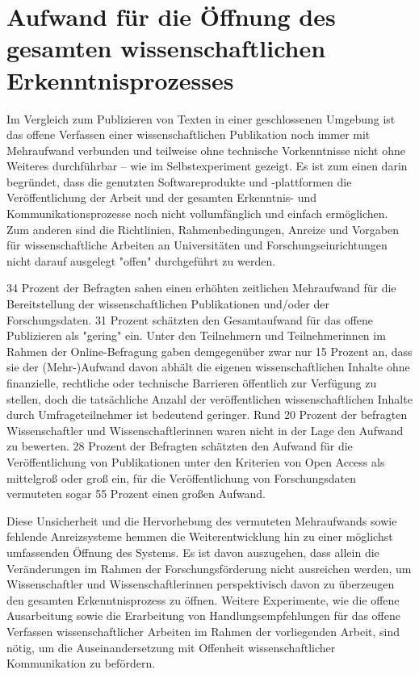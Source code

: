 \section{Aufwand für die Öffnung des gesamten wissenschaftlichen Erkenntnisprozesses}

Im Vergleich zum Publizieren von Texten in einer geschlossenen Umgebung ist das offene Verfassen einer wissenschaftlichen Publikation noch immer mit Mehraufwand verbunden und teilweise ohne technische Vorkenntnisse nicht ohne Weiteres durchführbar – wie im Selbstexperiment gezeigt. Es ist zum einen darin begründet, dass die genutzten Softwareprodukte und -plattformen die Veröffentlichung der Arbeit und der gesamten Erkenntnis- und Kommunikationsprozesse noch nicht vollumfänglich und einfach ermöglichen. Zum anderen sind die Richtlinien, Rahmenbedingungen, Anreize und Vorgaben für wissenschaftliche Arbeiten an Universitäten und Forschungseinrichtungen nicht darauf ausgelegt "offen" durchgeführt zu werden.

34 Prozent der Befragten sahen einen erhöhten zeitlichen Mehraufwand für die Bereitstellung der wissenschaftlichen Publikationen und/oder der Forschungsdaten. 31 Prozent schätzten den Gesamtaufwand für das offene Publizieren als "gering" ein. Unter den Teilnehmern und Teilnehmerinnen im Rahmen der Online-Befragung gaben demgegenüber zwar nur 15 Prozent an, dass sie der (Mehr-)Aufwand davon abhält die eigenen wissenschaftlichen Inhalte ohne finanzielle, rechtliche oder technische Barrieren öffentlich zur Verfügung zu stellen, doch die tatsächliche Anzahl der veröffentlichen wissenschaftlichen Inhalte durch Umfrageteilnehmer ist bedeutend geringer. Rund 20 Prozent der befragten Wissenschaftler und Wissenschaftlerinnen waren nicht in der Lage den Aufwand zu bewerten. 28 Prozent der Befragten schätzten den Aufwand für die Veröffentlichung von Publikationen unter den Kriterien von Open Access als mittelgroß oder groß ein, für die Veröffentlichung von Forschungsdaten vermuteten sogar 55 Prozent einen großen Aufwand.

Diese Unsicherheit und die Hervorhebung des vermuteten Mehraufwands sowie fehlende Anreizsysteme hemmen die Weiterentwicklung hin zu einer möglichst umfassenden Öffnung des Systems. Es ist davon auszugehen, dass allein die Veränderungen im Rahmen der Forschungsförderung nicht ausreichen werden, um Wissenschaftler und Wissenschaftlerinnen perspektivisch davon zu überzeugen den gesamten Erkenntnisprozess zu öffnen. Weitere Experimente, wie die offene Ausarbeitung sowie die Erarbeitung von Handlungsempfehlungen für das offene Verfassen wissenschaftlicher Arbeiten im Rahmen der vorliegenden Arbeit, sind nötig, um die Auseinandersetzung mit Offenheit wissenschaftlicher Kommunikation zu befördern.

